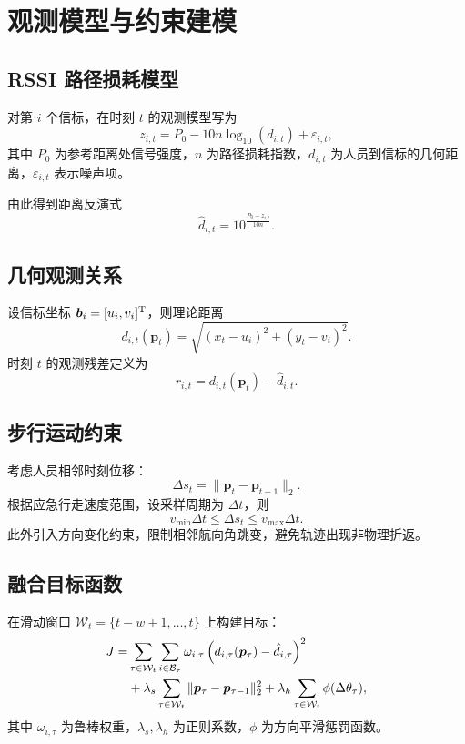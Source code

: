 \chapter{观测模型与约束建模}

\section{RSSI 路径损耗模型}
对第 $i$ 个信标，在时刻 $t$ 的观测模型写为
\begin{equation}
z_{i,t}=P_0-10n\log_{10}(d_{i,t})+\varepsilon_{i,t},
\end{equation}
其中 $P_0$ 为参考距离处信号强度，$n$ 为路径损耗指数，$d_{i,t}$ 为人员到信标的几何距离，$\varepsilon_{i,t}$ 表示噪声项。

由此得到距离反演式
\begin{equation}
\hat d_{i,t}=10^{\frac{P_0-z_{i,t}}{10n}}.
\label{eq:rssi2dist}
\end{equation}

\section{几何观测关系}
设信标坐标 $\bm b_i=[u_i,v_i]^{\mathrm{T}}$，则理论距离
\begin{equation}
d_{i,t}(\bm p_t)=\sqrt{(x_t-u_i)^2+(y_t-v_i)^2}.
\end{equation}
时刻 $t$ 的观测残差定义为
\[
r_{i,t}=d_{i,t}(\bm p_t)-\hat d_{i,t}.
\]

\section{步行运动约束}
考虑人员相邻时刻位移：
\[
\Delta s_t=\|\bm p_t-\bm p_{t-1}\|_2.
\]
根据应急行走速度范围，设采样周期为 $\Delta t$，则
\[
v_{\min}\Delta t \le \Delta s_t \le v_{\max}\Delta t.
\]
此外引入方向变化约束，限制相邻航向角跳变，避免轨迹出现非物理折返。

\section{融合目标函数}
在滑动窗口 $\mathcal W_t=\{t-w+1,\dots,t\}$ 上构建目标：
\begin{align}
J=&\sum_{\tau\in\mathcal W_t}\sum_{i\in\mathcal B_\tau}
\omega_{i,\tau}\left(d_{i,\tau}(\bm p_\tau)-\hat d_{i,\tau}\right)^2 \notag\\
&+\lambda_s\sum_{\tau\in\mathcal W_t}\|\bm p_\tau-\bm p_{\tau-1}\|_2^2
+\lambda_h\sum_{\tau\in\mathcal W_t}\phi(\Delta\theta_\tau),
\label{eq:fusion_obj}
\end{align}
其中 $\omega_{i,\tau}$ 为鲁棒权重，$\lambda_s,\lambda_h$ 为正则系数，$\phi$ 为方向平滑惩罚函数。

